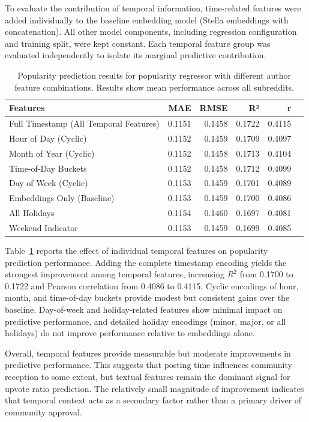 To evaluate the contribution of temporal information, time-related features were added individually to the baseline embedding model (Stella embeddings with concatenation). All other model components, including regression configuration and training split, were kept constant.
Each temporal feature group was evaluated independently to isolate its marginal predictive contribution.

\begin{table}[htbp]
\centering
\caption{Popularity prediction results for popularity regressor with different author feature combinations. Results show mean performance across all subreddits.}
\label{tab:temporal_features}
\begin{tabular}{lrrrrr}
\toprule
Features & MAE & RMSE & R² & r \\
\midrule
Full Timestamp (All Temporal Features) & 0.1151 & 0.1458 & 0.1722 & 0.4115 \\
Hour of Day (Cyclic) & 0.1152 & 0.1459 & 0.1709 & 0.4097 \\
Month of Year (Cyclic) & 0.1152 & 0.1458 & 0.1713 & 0.4104 \\
Time-of-Day Buckets & 0.1152 & 0.1458 & 0.1712 & 0.4099 \\
Day of Week (Cyclic) & 0.1153 & 0.1459 & 0.1701 & 0.4089 \\
Embeddings Only (Baseline) & 0.1153 & 0.1459 & 0.1700 & 0.4086 \\
All Holidays & 0.1154 & 0.1460 & 0.1697 & 0.4081 \\
Weekend Indicator & 0.1153 & 0.1459 & 0.1699 & 0.4085 \\
\bottomrule
\end{tabular}
\end{table}

Table~\ref{tab:temporal_features} reports the effect of individual temporal features on popularity prediction performance. Adding the complete timestamp encoding yields the strongest improvement among temporal features, increasing $R^2$ from 0.1700 to 0.1722 and Pearson correlation from 0.4086 to 0.4115. Cyclic encodings of hour, month, and time-of-day buckets provide modest but consistent gains over the baseline. Day-of-week and holiday-related features show minimal impact on predictive performance, and detailed holiday encodings (minor, major, or all holidays) do not improve performance relative to embeddings alone.

Overall, temporal features provide measurable but moderate improvements in predictive performance. This suggests that posting time influences community reception to some extent, but textual features remain the dominant signal for upvote ratio prediction. The relatively small magnitude of improvement indicates that temporal context acts as a secondary factor rather than a primary driver of community approval.

